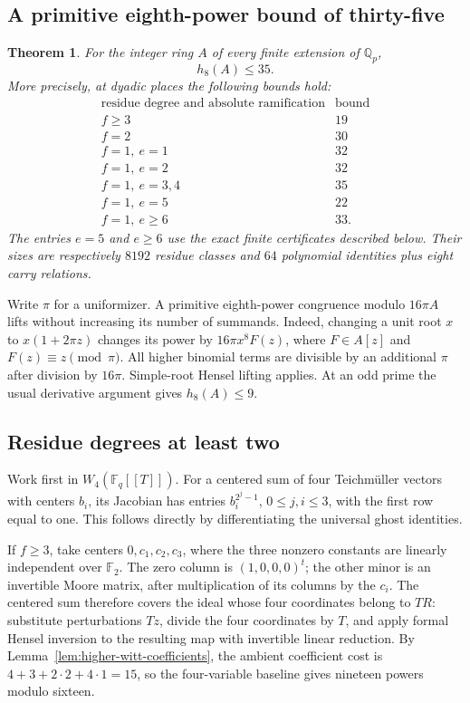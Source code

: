\documentclass[11pt]{amsart}
\newtheorem{theorem}{Theorem}[section]
\theoremstyle{definition}
\numberwithin{equation}{section}
\begin{document}
\subsection{A primitive eighth-power bound of thirty-five}

\begin{theorem}\label{thm:local-eighth-thirtyfive}
For the integer ring $A$ of every finite extension of $\mathbb Q_p$,
\[
 h_8(A)\le35.
\]
More precisely, at dyadic places the following bounds hold:
\[
 \begin{array}{c|c}
 \text{residue degree and absolute ramification}&\text{bound}\\\hline
 f\ge3&19\\
 f=2&30\\
 f=1,\ e=1&32\\
 f=1,\ e=2&32\\
 f=1,\ e=3,4&35\\
 f=1,\ e=5&22\\
 f=1,\ e\ge6&33.
 \end{array}
\]
The entries $e=5$ and $e\ge6$ use the exact finite certificates
described below. Their sizes are respectively $8192$ residue classes
and $64$ polynomial identities plus eight carry relations.
\end{theorem}

Write $\pi$ for a uniformizer. A primitive eighth-power congruence
modulo $16\pi A$ lifts without increasing its number of summands.
Indeed, changing a unit root $x$ to $x(1+2\pi z)$ changes its power by
$16\pi x^8F(z)$, where $F\in A[z]$ and $F(z)\equiv z\pmod\pi$.
All higher binomial terms are divisible by an additional $\pi$ after
division by $16\pi$. Simple-root Hensel lifting applies.
At an odd prime the usual derivative argument gives $h_8(A)\le9$.

\subsection{Residue degrees at least two}

Work first in $W_4(\mathbb F_q[[T]])$. For a centered sum of four
Teichm\"uller vectors with centers $b_i$, its Jacobian has entries
$b_i^{2^j-1}$, $0\le j,i\le3$, with the first row equal to one.
This follows directly by differentiating the universal ghost identities.

If $f\ge3$, take centers $0,c_1,c_2,c_3$, where the three nonzero
constants are linearly independent over $\mathbb F_2$. The zero column
is $(1,0,0,0)^t$; the other minor is an invertible Moore matrix, after
multiplication of its columns by the $c_i$. The centered sum therefore
covers the ideal whose four coordinates belong to $TR$: substitute
perturbations $Tz$, divide the four coordinates by $T$, and apply
formal Hensel inversion to the resulting map with invertible
linear reduction.
By Lemma~\ref{lem:higher-witt-coefficients}, the ambient coefficient cost is
$4+3+2\cdot2+4\cdot1=15$, so the four-variable baseline gives
nineteen powers modulo sixteen.
\end{document}
